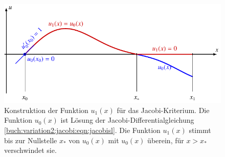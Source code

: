 %
%
%
\begin{figure}
\centering
\includegraphics{chapters/060-variation2/images/xstern.pdf}
\caption{Konstruktion der Funktion $u_1(x)$ für das Jacobi-Kriterium.
Die Funktion $u_0(x)$ ist Lösung der Jacobi-Differentialgleichung
\eqref{buch:variation2:jacobi:eqn:jacobisl}.
Die Funktion $u_1(x)$ stimmt bis zur Nullstelle $x_*$ von $u_0(x)$ mit
$u_0(x)$ überein, für $x>x_*$ verschwindet sie.
\label{buch:variation2:fig:xstern}}
\end{figure}

